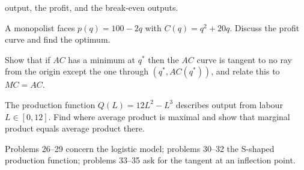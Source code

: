 \begin{problems}
        output, the profit, and the break-even outputs.
  \item A monopolist faces $p(q)=100-2q$ with $C(q)=q^{2}+20q$. Discuss the
        profit curve and find the optimum.
  \item Show that if $AC$ has a minimum at $q^{*}$ then the $AC$ curve is
        tangent to no ray from the origin except the one through
        $(q^{*},AC(q^{*}))$, and relate this to $MC=AC$.
  \item The production function $Q(L)=12L^{2}-L^{3}$ describes output from
        labour $L\in[0,12]$. Find where average product is maximal and show
        that marginal product equals average product there.
\end{problems}

Problems 26--29 concern the logistic model; problems 30--32 the S-shaped
production function; problems 33--35 ask for the tangent at an inflection
point.

